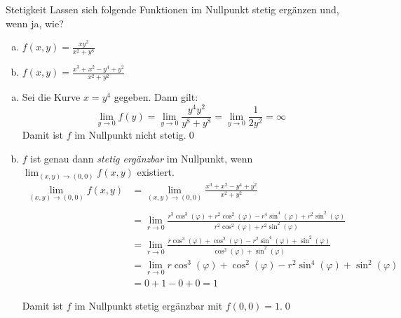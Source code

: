 \documentclass[german]{../spicker}
\begin{document}
\begin{example}{Stetigkeit}
    Lassen sich folgende Funktionen im Nullpunkt stetig ergänzen und, wenn ja, wie?
    \begin{enumerate}[(a)]
        \item $f(x,y) = \frac{xy^2}{x^2 + y^8}$
        \item $f(x,y) = \frac{x^3 + x^2 - y^4 + y^2}{x^2 + y^2}$
    \end{enumerate}

    \noindent\makebox[\linewidth]{\rule{\textwidth}{1pt}}

    \begin{enumerate}[(a)]
        \item
              Sei die Kurve $x = y^4$ gegeben.
              Dann gilt:
              $$
                  \lim_{y\to 0} f(y) = \lim_{y\to 0} \frac{y^4y^2}{y^8+y^8} = \lim_{y\to 0} \frac{1}{2y^2} = \infty
              $$
              Damit ist $f$ im Nullpunkt nicht stetig.\qed
        \item
              $f$ ist genau dann \emph{stetig ergänzbar} im Nullpunkt, wenn $\lim_{(x,y) \to (0,0)} f(x,y)$ existiert.
              $$
                  \begin{aligned}
                      \lim_{(x,y) \to (0,0)} f(x,y) & = \lim_{(x,y) \to (0,0)} \frac{x^3 + x^2 - y^4 + y^2}{x^2 + y^2}                                                                                    \\                                                                        \\
                                                    & =  \lim_{r \to 0} \frac{r^3\cos^3(\varphi) + r^2\cos^2(\varphi) - r^4\sin^4(\varphi) + r^2\sin^2(\varphi)}{r^2\cos^2(\varphi) + r^2\sin^2(\varphi)} \\
                                                    & =  \lim_{r \to 0} \frac{r\cos^3(\varphi) + \cos^2(\varphi) - r^2\sin^4(\varphi) + \sin^2(\varphi)}{\cos^2(\varphi) + \sin^2(\varphi)}               \\
                                                    & =  \lim_{r \to 0} r\cos^3(\varphi) + \cos^2(\varphi) - r^2\sin^4(\varphi) + \sin^2(\varphi)                                                         \\
                                                    & =  0 + 1 - 0 + 0 = 1
                  \end{aligned}
              $$

              Damit ist $f$ im Nullpunkt stetig ergänzbar mit $f(0, 0) = 1$.\qed
    \end{enumerate}
\end{example}
\end{document}
